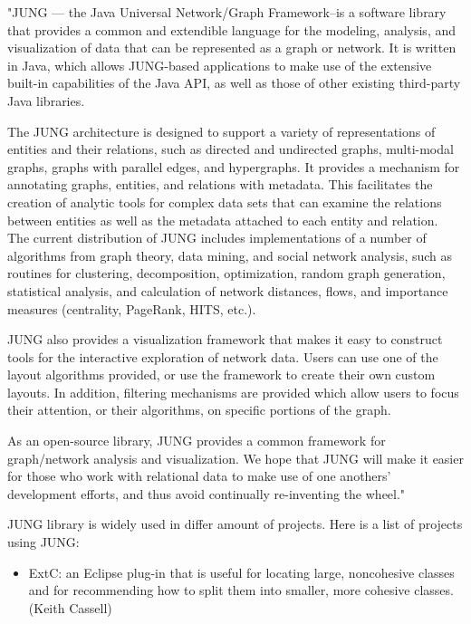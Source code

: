 \documentclass[a4paper,oneside]{article}
\begin{document}
\begin{enumerate}
"JUNG — the Java Universal Network/Graph Framework--is a software library that provides a common and extendible language for the modeling, analysis, and visualization of data that can be represented as a graph or network. It is written in Java, which allows JUNG-based applications to make use of the extensive built-in capabilities of the Java API, as well as those of other existing third-party Java libraries.


The JUNG architecture is designed to support a variety of representations of entities and their relations, such as directed and undirected graphs, multi-modal graphs, graphs with parallel edges, and hypergraphs. It provides a mechanism for annotating graphs, entities, and relations with metadata. This facilitates the creation of analytic tools for complex data sets that can examine the relations between entities as well as the metadata attached to each entity and relation.
The current distribution of JUNG includes implementations of a number of algorithms from graph theory, data mining, and social network analysis, such as routines for clustering, decomposition, optimization, random graph generation, statistical analysis, and calculation of network distances, flows, and importance measures (centrality, PageRank, HITS, etc.).


JUNG also provides a visualization framework that makes it easy to construct tools for the interactive exploration of network data. Users can use one of the layout algorithms provided, or use the framework to create their own custom layouts. In addition, filtering mechanisms are provided which allow users to focus their attention, or their algorithms, on specific portions of the graph.


As an open-source library, JUNG provides a common framework for graph/network analysis and visualization. We hope that JUNG will make it easier for those who work with relational data to make use of one anothers' development efforts, and thus avoid continually re-inventing the wheel."~\cite{JUNG_OVERVIEW}


JUNG library is widely used in differ amount of projects. Here is a list of projects using JUNG:

\begin{itemize}

\item ExtC: an Eclipse plug-in that is useful for locating large, noncohesive classes and for recommending how to split them into smaller, more cohesive classes. (Keith Cassell)~\cite{EXTC}


\end{itemize}
\end{enumerate}
\end{document}
